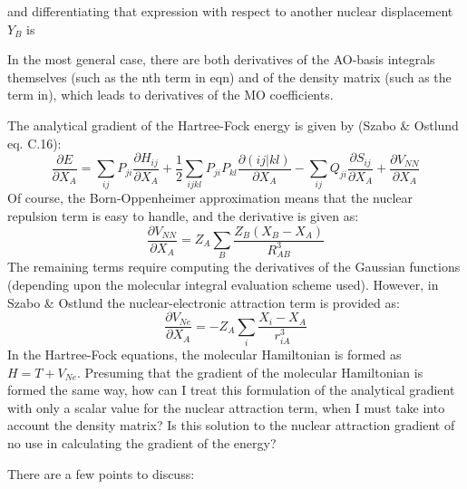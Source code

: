 \documentclass[%
class = book,%
crop = false,%
float = true,%
multi = true,%
preview = false,%
]{standalone}
\begin{document}
and differentiating that expression with respect to another nuclear displacement \(Y_{B}\) is

In the most general case, there are both derivatives of the AO-basis integrals themselves (such as the nth term in eqn) and of the density matrix (such as the term in), which leads to derivatives of the MO coefficients.


The analytical gradient of the Hartree-Fock energy is given by (Szabo \& Ostlund eq. C.16):
\begin{equation}
  \frac{\partial E}{\partial X_{A}} = \sum_{ij}{P_{ji} \frac{\partial H_{ij}}{\partial X_{A}}} + \frac{1}{2} \sum_{ijkl}{P_{ji}P_{kl} \frac{\partial (ij|kl)}{\partial X_{A}}} - \sum_{ij}{Q_{ji} \frac{\partial S_{ij}}{\partial X_{A}}} + \frac{\partial V_{NN}}{\partial X_{A}}
\end{equation}
Of course, the Born-Oppenheimer approximation means that the nuclear repulsion term is easy to handle, and the derivative is given as:
\begin{equation}
  \frac{\partial V_{NN}}{\partial X_{A}} = Z_{A} \sum_{B} \frac{Z_{B} (X_{B} - X_{A})}{R_{AB}^{3}}
\end{equation}
The remaining terms require computing the derivatives of the Gaussian functions (depending upon the molecular integral evaluation scheme used). However, in Szabo \& Ostlund the nuclear-electronic attraction term is provided as:
\begin{equation}
  \frac{\partial V_{Ne}}{\partial X_{A}} = -Z_{A} \sum_{i} \frac{X_{i} - X_{A}}{r_{iA}^{3}}
\end{equation}
In the Hartree-Fock equations, the molecular Hamiltonian is formed as \(H = T + V_{Ne}\). Presuming that the gradient of the molecular Hamiltonian is formed the same way, how can I treat this formulation of the analytical gradient with only a scalar value for the nuclear attraction term, when I must take into account the density matrix? Is this solution to the nuclear attraction gradient of no use in calculating the gradient of the energy?

There are a few points to discuss:
\end{document}
